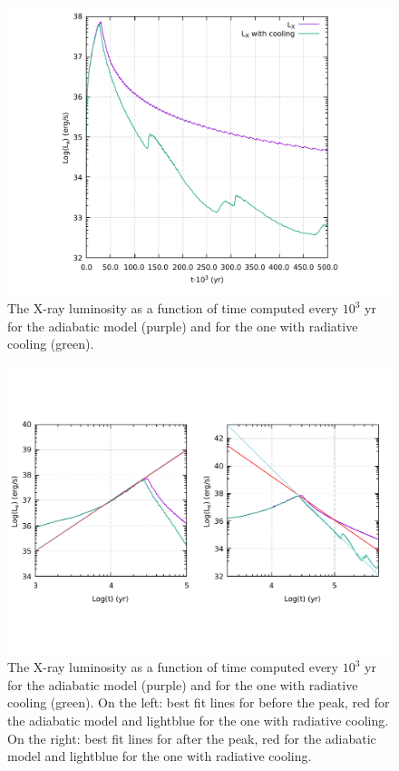 \documentclass{article}
\begin{document}
\begin{figure}[H]
	\centering
	\includegraphics[width=0.6 \linewidth]{luminosity.pdf}
	\caption{The X-ray luminosity as a function of time computed every $10^3$ yr for the adiabatic model (purple) and for the one with radiative cooling (green).}

	\label{fig:luminosity}
\end{figure}

\begin{figure}[H]
	\centering
	\includegraphics[width=0.8 \linewidth]{luminosityfit.pdf}
	\caption{The X-ray luminosity as a function of time computed every $10^3$ yr for the adiabatic model (purple) and for the one with radiative cooling (green). On the left: best fit lines for before the peak, red for the adiabatic model and lightblue for the one with radiative cooling. On the right:  best fit lines for after the peak, red for the adiabatic model and lightblue for the one with radiative cooling.}

	\label{fig:luminosityfit}
\end{figure}
\end{document}

